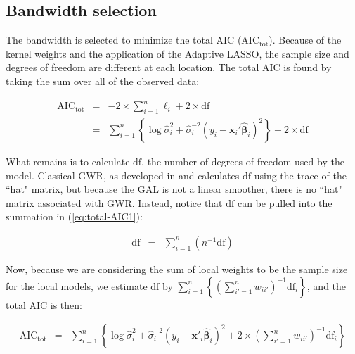 \documentclass[authoryear, review, 11pt]{elsarticle}
\begin{document}
	\subsection{Bandwidth selection}
	The bandwidth is selected to minimize the total AIC ($\mbox{AIC}_{\mbox{tot}}$). Because of the kernel weights and the application of the Adaptive LASSO, the sample size and degrees of freedom are different at each location. The total AIC is found by taking the sum over all of the observed data:	
		
	\begin{eqnarray}
		\mbox{AIC}_{\mbox{tot}} &=& -2 \times \sum_{i=1}^n \ell_i + 2 \times \mbox{df}\\
		&=& \sum_{i=1}^n \left\{ \log \hat{\sigma}_i^2 + \hat{\sigma}_i^{-2} \left(y_i - \bm{x}_i' \hat{\bm{\beta}}_i \right)^2 \right\} + 2 \times \mbox{df}\label{eq:total-AIC1}
	\end{eqnarray}	
	
	What remains is to calculate $\mbox{df}$, the number of degrees of freedom used by the model. Classical GWR, as developed in \cite{Loader:1999} and \cite{Fotheringham:2002} calculates $\mbox{df}$ using the trace of the ``hat" matrix, but because the GAL is not a linear smoother, there is no ``hat" matrix associated with GWR. Instead, notice that $\mbox{df}$ can be pulled into the summation in (\ref{eq:total-AIC1}):
		
			
	\begin{eqnarray}
		\mbox{df} &=& \sum_{i=1}^n \left( n^{-1} \mbox{df} \right)
	\end{eqnarray}
	
	Now, because we are considering the sum of local weights to be the sample size for the local models, we estimate $\mbox{df}$ by $\sum_{i=1}^n \left\{ \left(\sum_{i'=1}^n w_{ii'} \right)^{-1} \mbox{df}_i \right\}$, and the total AIC is then:
	
	\begin{eqnarray}\label{eq:total-AIC2}
		\mbox{AIC}_{\mbox{tot}} &=& \sum_{i=1}^n \left\{ \log \hat{\sigma}_i^2 + \hat{\sigma}_i^{-2} \left(y_i - \bm{x}'_i \hat{\bm{\beta}}_i \right)^2 + 2 \times \left(\sum_{i'=1}^n w_{ii'} \right)^{-1} \mbox{df}_i \right\}
	\end{eqnarray}
			
\end{document}
